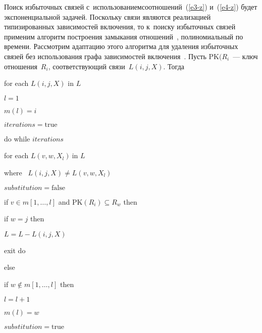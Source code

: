 \begin{multicols}{2}
  \smallskip

  Поиск избыточных связей с~использованием\linebreak соотношений~(\ref{e3-z})
и~(\ref{e4-z}) будет экспоненциальной задачей. Поскольку связи являются
реализацией типизированных зависимостей включения, то к~поиску
избыточных связей применим алгоритм по\-стро\-ения замыкания
отношений~\cite{2-z}, полиномиальный по времени. Рассмотрим адаптацию
этого алгоритма для удаления избыточных связей без использования графа
зависимостей включения~\cite{6-z}. Пусть $\mathrm{PK}(R_i$~--- ключ
отношения~$R_i$, соответст\-ву\-ющий связи~$L(i,j,X)$. Тогда

\noindent
for each $L(i,j,X)$ in $L$

\hspace*{2mm}$l=1$

\hspace*{2mm}$m(l)=i$

\hspace*{2mm}$iterations=\mathrm{true}$

\hspace*{2mm}do while $iterations$

\hspace*{3mm}for each $L(v,w,X_l)\ \mbox{in\ } L$

\hspace*{3mm}\mbox{where\ } $L(i,j,X)\not= L(v,w,X_l)$

\hspace*{4mm}$substitution=\mathrm{false}$

\hspace*{4mm}if $v\in m[1,\ldots ,l]$ and $\mathrm{PK}(R_i)\subseteq R_w$ then

\hspace*{5mm}if $w=j$ then

\hspace*{6mm}$L=L-L(i,j,X)$

\hspace*{6mm}exit do

\hspace*{5mm}else

\hspace*{6mm}if $w\not\in m[1,\ldots ,l]$ then

\hspace*{7mm}$ l=l+1$

\hspace*{7mm}$m(l)=w$

\hspace*{7mm}$substitution=\mathrm{true}$


\end{multicols}
